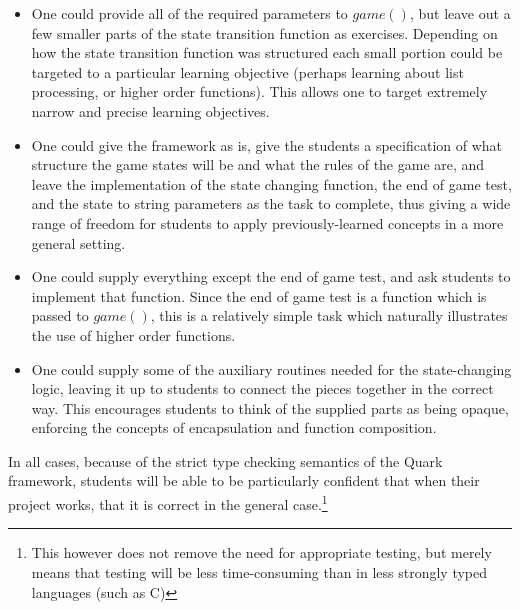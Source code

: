 \begin{itemize}
	\item One could provide all of the required parameters to \(game()\), but leave out a few smaller parts of the state transition function as exercises. Depending on how the state transition function was structured each small portion could be targeted to a particular learning objective (perhaps learning about list processing, or higher order functions).  This allows one to target extremely narrow and precise learning objectives.
	\item One could give the framework as is, give the students a specification of what structure the game states will be and what the rules of the game are, and leave the implementation of the state changing function, the end of game test, and the state to string parameters as the task to complete, thus giving a wide range of freedom for students to apply previously-learned concepts in a more general setting.
	\item One could supply everything except the end of game test, and ask students to implement that function.  Since the end of game test is a function which is passed to \(game()\), this is a relatively simple task which naturally illustrates the use of higher order functions.
	\item One could supply some of the auxiliary routines needed for the state-changing logic, leaving it up to students to connect the pieces together in the correct way.  This encourages students to think of the supplied parts as being opaque, enforcing the concepts of encapsulation and function composition.
\end{itemize}

In all cases, because of the strict type checking semantics of the Quark framework, students will be able to be particularly confident that when their project works, that it is correct in the general case.\footnote{This however does not remove the need for appropriate testing, but merely means that testing will be less time-consuming than in less strongly typed languages (such as C)}